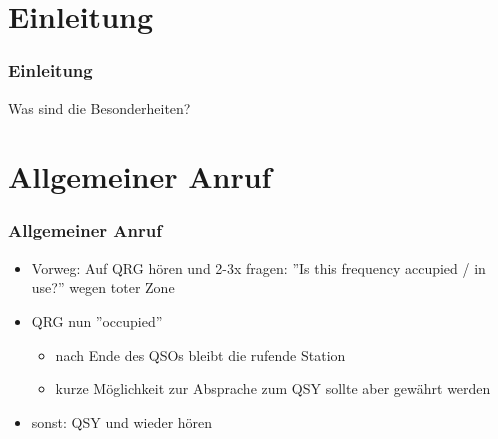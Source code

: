 

\subtitle{Betriebstechnik/Vorschriften 10: \\
          Betriebsabwicklung auf Kurzwelle \\[2em]}
\date{Stand 08.01.2015}


\section{Einleitung}

\begin{frame}
    \frametitle{Einleitung}

    Was sind die Besonderheiten?

\end{frame}

\section{Allgemeiner Anruf}

\begin{frame}
    \frametitle{Allgemeiner Anruf}

    \begin{itemize}
        \item Vorweg: Auf QRG hören und 2-3x fragen: ''Is this frequency accupied /
              in use?'' wegen toter Zone
        \item QRG nun ''occupied''
        \begin{itemize}
            \item nach Ende des QSOs bleibt die rufende Station
            \item kurze Möglichkeit zur Absprache zum QSY sollte aber gewährt werden
        \end{itemize}
        \item sonst: QSY und wieder hören
    \end{itemize}

\end{frame}

